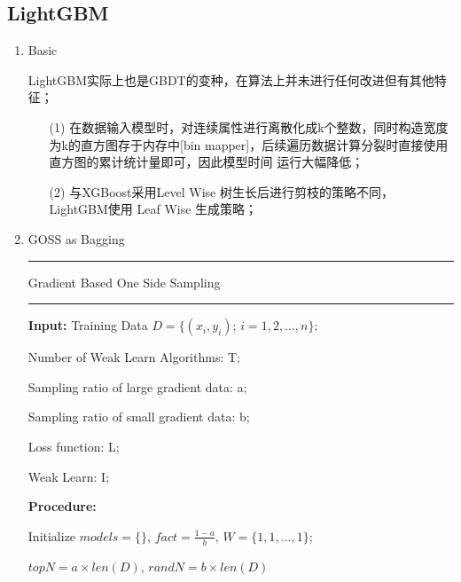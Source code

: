 \documentclass[a4paper]{article}
\begin{document}
	\subsection{LightGBM}
		\begin{enumerate}
			\item Basic\par
				LightGBM实际上也是GBDT的变种，在算法上并未进行任何改进但有其他特征；
				\begin{itemize}
					\item[(1)] 在数据输入模型时，对连续属性进行离散化成k个整数，同时构造宽度为k的直方图存于内存中[bin mapper]，后续遍历数据计算分裂时直接使用直方图的累计统计量即可，因此模型时间			运行大幅降低；
					\item[(2)] 与XGBoost采用Level Wise 树生长后进行剪枝的策略不同， LightGBM使用 Leaf Wise 生成策略；
				\end{itemize}
			\item GOSS as Bagging\par
				\noindent\rule[0.10\baselineskip]{\textwidth}{0.75pt}\par
				Gradient Based One Side Sampling\\
				\noindent\rule[0.10\baselineskip]{\textwidth}{0.5pt}
						\textbf{Input:} Training Data $D=\{(x_i,y_i);\, i = 1,2,\dots, n\};$\par
						\hspace*{32pt} Number of Weak Learn Algorithms: T;\par
						\hspace*{32pt} Sampling ratio of large gradient data: a;\par
						\hspace*{32pt} Sampling ratio of small gradient data: b;\par
						\hspace*{32pt} Loss function: L;\par
						\hspace*{32pt} Weak Learn: I;\par
						\textbf{Procedure:}\par
						\hspace*{32pt} Initialize $models = \{\},\,fact = \frac{1-a}{b},\, W = \{1,1,\dots,1\}$;\par
						\hspace*{32pt} $topN = a\times len(D),\, randN = b\times len(D)$\par

\end{enumerate}
\end{document}
